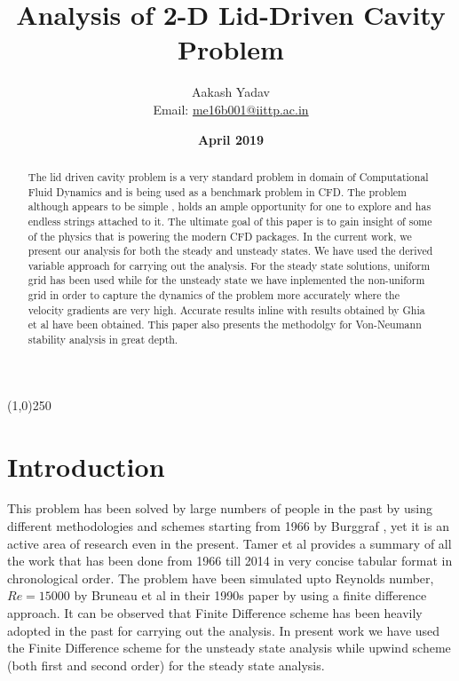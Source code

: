 \documentclass{article}
\title{\textbf{Analysis of 2-D Lid-Driven Cavity Problem}}
\author{Aakash Yadav\\ Email: \href{mailto:me16b001@iittp.ac.in}{me16b001@iittp.ac.in}}
\affil{\textbf{Indian Institute of Technology Tirupati}}
\date{\textbf{April 2019}}
\begin{document}
\maketitle

\begin{center}
\line(1,0){250}
\end{center}

\begin{abstract}
The lid driven cavity problem is a very standard problem in domain of Computational Fluid Dynamics and is being used as a benchmark problem in CFD. The problem although appears to be simple , holds an ample opportunity for one to explore and has endless strings  attached to it.  The ultimate goal of this paper is to gain insight of some of the physics that is powering the modern CFD packages. In the current work, we present our analysis for both the steady  and unsteady states. We have used the derived variable approach for carrying out the analysis. For the steady state solutions, uniform grid has been used while for the unsteady state we have inplemented the non-uniform grid in order to capture the dynamics of the problem more accurately where the velocity gradients are very high. 
Accurate results inline with results obtained by Ghia et al \citep{ghia} have been obtained.
This paper also presents the methodolgy for Von-Neumann stability analysis in great depth. 
\end{abstract}

\section{Introduction}
This problem has been solved by large numbers of people in the past by using different methodologies and schemes starting from 1966 by Burggraf \citep{burger}, yet it is an active area of research even in the present. Tamer et al \citep{tamer} provides a summary of all the work that has been done from 1966 till 2014 in very concise tabular format in chronological order.
The problem have been simulated upto Reynolds number, $Re=15000$ by Bruneau et al \citep{bruneau} in their 1990s paper by using a finite difference approach. It can be observed that Finite Difference scheme has been heavily adopted in the past for carrying out the analysis. In present work we have used the Finite Difference scheme for the unsteady state analysis while upwind scheme \citep{courant} (both first and second order) for the steady state analysis.
\end{document}
